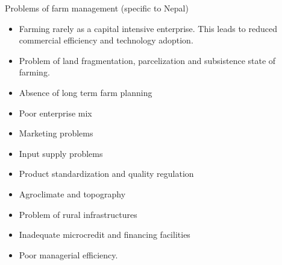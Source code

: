 \documentclass[12pt,ignorenonframetext,aspectratio=169]{beamer}
\providecommand{\tightlist}{%
  \setlength{\itemsep}{0pt}\setlength{\parskip}{0pt}}
\begin{document}
\begin{frame}{Problems of farm management (specific to Nepal)}
\protect\hypertarget{problems-of-farm-management-specific-to-nepal}{}
\begin{itemize}
\tightlist
\item
  Farming rarely as a capital intensive enterprise. This leads to
  reduced commercial efficiency and technology adoption.
\item
  Problem of land fragmentation, parcelization and subsistence state of
  farming.
\item
  Absence of long term farm planning
\item
  Poor enterprise mix
\item
  Marketing problems
\item
  Input supply problems
\item
  Product standardization and quality regulation
\item
  Agroclimate and topography
\item
  Problem of rural infrastructures
\item
  Inadequate microcredit and financing facilities
\item
  Poor managerial efficiency.
\end{itemize}
\end{frame}
\end{document}
